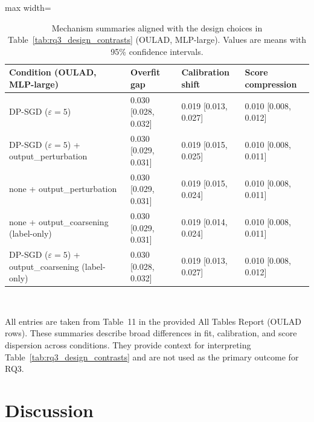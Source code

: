 \documentclass{edm_article}
\begin{document}
\begin{table}[t]
\centering
\caption{Mechanism summaries aligned with the design choices in Table~\ref{tab:rq3_design_contrasts} (OULAD, MLP-large). Values are means with 95\% confidence intervals.}
\label{tab:rq3_mechanism_evidence}
\begin{threeparttable}
\begin{adjustbox}{max width=\linewidth}
\begin{tabular}{@{}l l l l@{}}
\toprule
Condition (OULAD, MLP-large) & Overfit gap & Calibration shift & Score compression \\
\midrule
DP-SGD ($\varepsilon{=}5$) &
0.030 [0.028, 0.032] &
0.019 [0.013, 0.027] &
0.010 [0.008, 0.012] \\

DP-SGD ($\varepsilon{=}5$) + output\_perturbation &
0.030 [0.029, 0.031] &
0.019 [0.015, 0.025] &
0.010 [0.008, 0.011] \\

none + output\_perturbation &
0.030 [0.029, 0.031] &
0.019 [0.015, 0.024] &
0.010 [0.008, 0.011] \\

none + output\_coarsening (label-only) &
0.030 [0.029, 0.031] &
0.019 [0.014, 0.024] &
0.010 [0.008, 0.011] \\

DP-SGD ($\varepsilon{=}5$) + output\_coarsening (label-only) &
0.030 [0.028, 0.032] &
0.019 [0.013, 0.027] &
0.010 [0.008, 0.012] \\
\bottomrule
\end{tabular}
\end{adjustbox}
\\
\begin{flushleft}
\justifying
\footnotesize
\item All entries are taken from Table~11 in the provided All Tables Report (OULAD rows). These summaries describe broad differences in fit, calibration, and score dispersion across conditions. They provide context for interpreting Table~\ref{tab:rq3_design_contrasts} and are not used as the primary outcome for RQ3.
\end{flushleft}
\end{threeparttable}
\end{table}




\section{Discussion}
\end{document}
